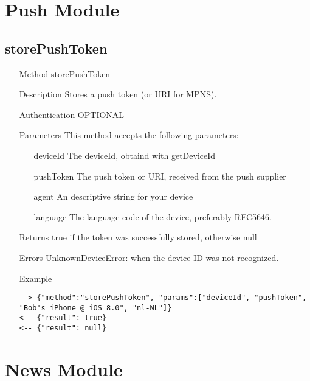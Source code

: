 \documentclass[a4paper]{scrreprt}
\begin{document}
\clearpage
\section{Push Module}\label{sec:pushmodule}
\subsection{storePushToken}
\begin{enumerate}
\item[Method] storePushToken
\item[Description] Stores a push token (or URI for MPNS).
\item[Authentication] OPTIONAL
\item[Parameters] This method accepts the following parameters:
\begin{enumerate}
	\item[deviceId] The deviceId, obtaind with getDeviceId
  	\item[pushToken] The push token or URI, received from the push supplier
	\item[agent] An descriptive string for your device
	\item[language] The language code of the device, preferably RFC5646.
    \end{enumerate}
\item[Returns] true if the token was successfully stored, otherwise null
\item[Errors] UnknownDeviceError: when the device ID was not recognized.
\item[Example]
\begin{lstlisting}
--> {"method":"storePushToken", "params":["deviceId", "pushToken", "Bob's iPhone @ iOS 8.0", "nl-NL"]}
<-- {"result": true}
<-- {"result": null}
\end{lstlisting}
\end{enumerate}


\clearpage
\section{News Module}
\end{document}

